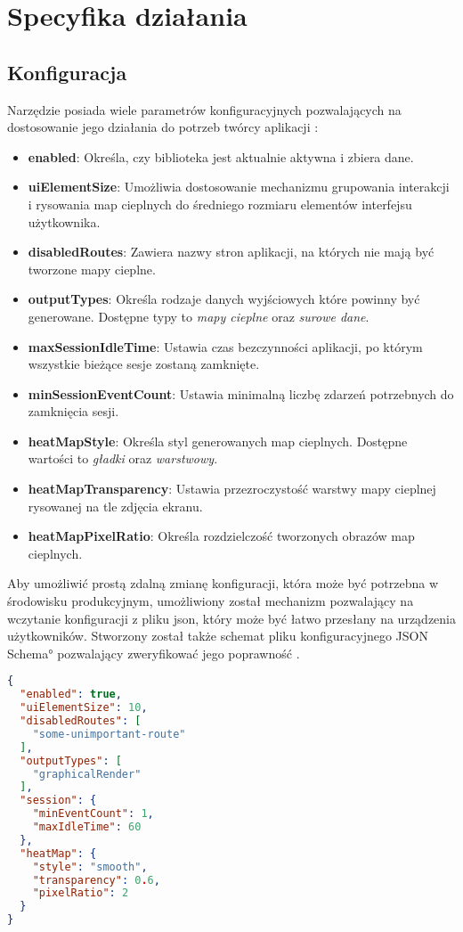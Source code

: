 \section{Specyfika działania}

\subsection{Konfiguracja}
Narzędzie posiada wiele parametrów konfiguracyjnych pozwalających na dostosowanie jego działania do potrzeb twórcy aplikacji \cite{RoundSpot_Config_Docs}:
\begin{itemize}
	\item {\bf enabled}: Określa, czy biblioteka jest aktualnie aktywna i zbiera dane.
	\item {\bf uiElementSize}: Umożliwia dostosowanie mechanizmu grupowania interakcji i rysowania map cieplnych do średniego rozmiaru elementów interfejsu użytkownika.
	\item {\bf disabledRoutes}: Zawiera nazwy stron aplikacji, na których nie mają być tworzone mapy cieplne.
	\item {\bf outputTypes}: Określa rodzaje danych wyjściowych które powinny być generowane. Dostępne typy to {\it mapy cieplne} oraz {\it surowe dane}.
	\item {\bf maxSessionIdleTime}: Ustawia czas bezczynności aplikacji, po którym wszystkie bieżące sesje zostaną zamknięte.
	\item {\bf minSessionEventCount}: Ustawia minimalną liczbę zdarzeń potrzebnych do zamknięcia sesji.
	\item {\bf heatMapStyle}: Określa styl generowanych map cieplnych. Dostępne wartości to {\it gładki} oraz {\it warstwowy}.
	\item {\bf heatMapTransparency}: Ustawia przezroczystość warstwy mapy cieplnej rysowanej na tle zdjęcia ekranu. 
	\item {\bf heatMapPixelRatio}: Określa rozdzielczość tworzonych obrazów map cieplnych.
\end{itemize}

Aby umożliwić prostą zdalną zmianę konfiguracji, która może być potrzebna w środowisku produkcyjnym, umożliwiony został mechanizm pozwalający na wczytanie konfiguracji z pliku json, który może być łatwo przesłany na urządzenia użytkowników. Stworzony został także schemat pliku konfiguracyjnego \ang{JSON Schema} pozwalający zweryfikować jego poprawność \cite{RoundSpot_Config_Schema}.

\begin{lstlisting}[language=json,caption={Przykładowy plik konfiguracyjny w formacie json},label=lst:rs_config_json]
{
  "enabled": true,
  "uiElementSize": 10,
  "disabledRoutes": [
    "some-unimportant-route"
  ],
  "outputTypes": [
    "graphicalRender"
  ],
  "session": {
    "minEventCount": 1,
    "maxIdleTime": 60
  },
  "heatMap": {
    "style": "smooth",
    "transparency": 0.6,
    "pixelRatio": 2
  }
}
\end{lstlisting}

